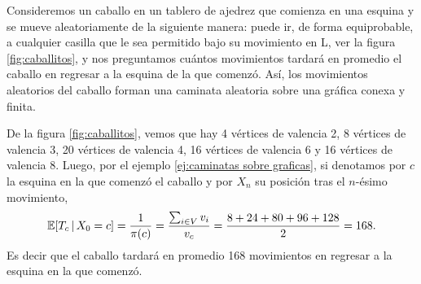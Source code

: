 \begin{example}
    Consideremos un caballo en un tablero de ajedrez que comienza en una esquina y se mueve aleatoriamente de la siguiente manera: puede ir, de forma equiprobable, a cualquier casilla que le sea permitido bajo su movimiento en L, ver la figura \ref{fig:caballitos}, y nos preguntamos cuántos movimientos tardará en promedio el caballo en regresar a la esquina de la que comenzó. Así, los movimientos aleatorios del caballo forman una caminata aleatoria sobre una gráfica conexa y finita. 

    De la figura \ref{fig:caballitos}, vemos que hay 4 vértices de valencia 2, 8 vértices de valencia 3, 20 vértices de valencia 4, 16 vértices de valencia 6 y 16 vértices de valencia 8. Luego, por el ejemplo \ref{ej:caminatas sobre graficas}, si denotamos por $c$ la esquina en la que comenzó el caballo y por $X_n$ su posición tras el $n$-ésimo movimiento,
    \[
        \mathbb{E}[T_c \,\vert\, X_0 = c] = \frac 1 {\pi(c)} = \frac{\sum_{i \in V} v_i}{v_c} = \frac{8 + 24 + 80 + 96 + 128}{2} = 168.
    \]
    Es decir que el caballo tardará en promedio 168 movimientos en regresar a la esquina en la que comenzó.

    \begin{figure}[ht]
        \centering
        \begin{subfigure}[b]{0.3\textwidth}
        \end{subfigure} ~
        \begin{subfigure}[b]{0.3\textwidth}
\end{subfigure}
\end{figure}
\end{example}
